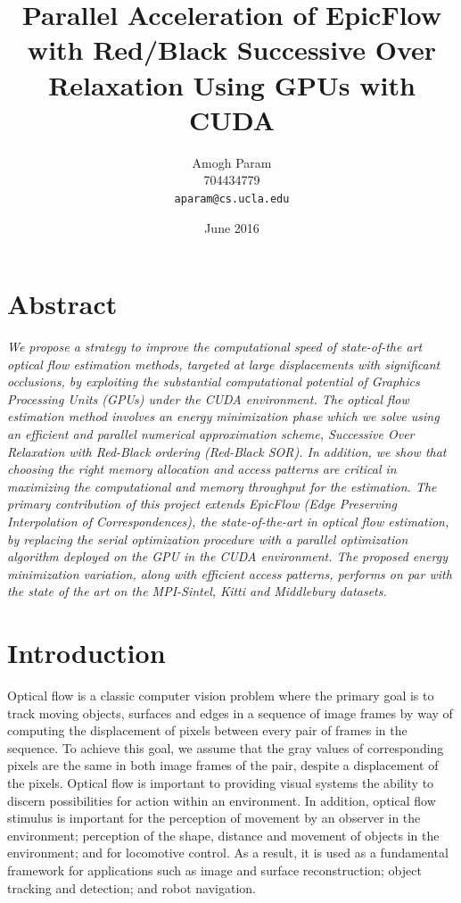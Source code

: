 \documentclass{article}
\title{Parallel Acceleration of EpicFlow with Red/Black Successive Over Relaxation Using GPUs with CUDA}
\author{
  Amogh Param\\
  704434779\\
  \texttt{aparam@cs.ucla.edu}
}
\date{June 2016}
\begin{document}
    \maketitle
     
    \begin{multicols}{2}
    \section*{Abstract}  
	 \textit{We propose a strategy to improve the computational speed of state-of-the art optical flow estimation methods, targeted at large displacements with significant occlusions, by exploiting the substantial computational potential of Graphics Processing Units (GPUs) under the CUDA environment. The optical flow estimation method involves an energy minimization phase which we solve using an efficient and parallel numerical approximation scheme, Successive Over Relaxation with Red-Black ordering (Red-Black SOR). In addition, we show that choosing the right memory allocation and access patterns are critical in maximizing the computational and memory throughput for the estimation. The primary contribution of this project extends  EpicFlow (Edge Preserving Interpolation of Correspondences), the state-of-the-art in optical flow estimation, by replacing the serial optimization procedure with a parallel optimization algorithm deployed on the GPU in the CUDA environment. The proposed energy minimization variation, along with efficient access patterns, performs on par with the state of the art on the MPI-Sintel, Kitti and Middlebury datasets.}
    \section{Introduction}
   Optical flow is a classic computer vision problem where the primary goal is to track moving objects, surfaces and edges in a sequence of image frames by way of computing the displacement of pixels between every pair of frames in the sequence. To achieve this goal, we assume that the gray values of corresponding pixels are the same in both image frames of the pair, despite a displacement of the pixels. Optical flow is important to providing visual systems the ability to discern possibilities for action within an environment. In addition, optical flow stimulus is important for the perception of movement by an observer in the environment; perception of the shape, distance and movement of objects in the environment; and for locomotive control. As a result, it is used as a fundamental framework for applications such as image and surface reconstruction; object tracking and detection; and robot navigation. \newline


\end{multicols}
\end{document}
